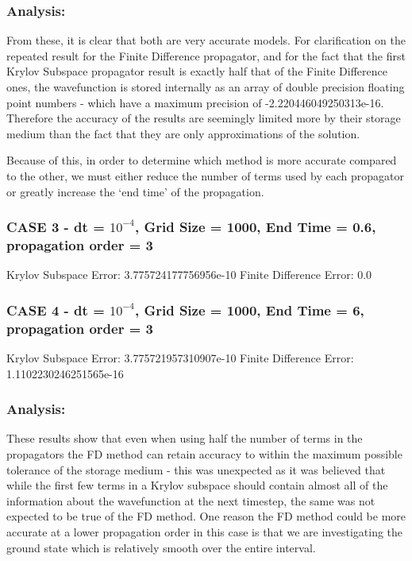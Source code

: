 \subsubsection{Analysis:}
From these, it is clear that both are very accurate models. For clarification on the repeated result for the Finite Difference propagator, and for the fact that the first Krylov Subspace propagator result is exactly half that of the Finite Difference ones, the wavefunction is stored internally as an array of double precision floating point numbers - which have a maximum precision of -2.220446049250313e-16. Therefore the accuracy of the results are seemingly limited more by their storage medium than the fact that they are only approximations of the solution. 

Because of this, in order to determine which method is more accurate compared to the other, we must either reduce the number of terms used by each propagator or greatly increase the `end time' of the propagation.

\subsubsection{CASE 3 - dt = $10^{-4}$, Grid Size = 1000, End Time = 0.6, propagation order = 3}
Krylov Subspace Error: 3.775724177756956e-10\newline
Finite Difference Error: 0.0

\subsubsection{CASE 4 - dt = $10^{-4}$, Grid Size = 1000, End Time = 6, propagation order = 3}
Krylov Subspace Error: 3.775721957310907e-10\newline
Finite Difference Error: 1.1102230246251565e-16 

\subsubsection{Analysis:}
These results show that even when using half the number of terms in the propagators the FD method can retain accuracy to within the maximum possible tolerance of the storage medium - this was unexpected as it was believed that while the first few terms in a Krylov subspace should contain almost all of the information about the wavefunction at the next timestep, the same was not expected to be true of the FD method. One reason the FD method could be more accurate at a lower propagation order in this case is that we are investigating the ground state which is relatively smooth over the entire interval. 

